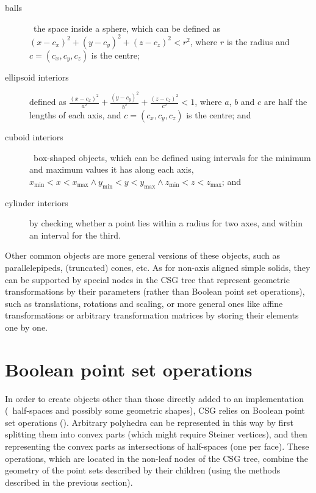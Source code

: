 \begin{description}
\item[balls] \ie\ the space inside a sphere, which can be defined as \( (x-c_x)^2 + (y-c_y)^2 + (z-c_z)^2 < r^2\), where \(r\) is the radius and \(c = (c_x, c_y, c_z)\) is the centre;
\item[ellipsoid interiors] defined as \( \frac{(x-c_x)^2}{a^2} + \frac{(y-c_y)^2}{b^2} + \frac{(z-c_z)^2}{c^2} < 1 \), where \(a\), \(b\) and \(c\) are half the lengths of each axis, and \(c = (c_x, c_y, c_z)\) is the centre; and
\item[cuboid interiors] \ie\ box-shaped objects, which can be defined using intervals for the minimum and maximum values it has along each axis, \ie\ \( x_\mathrm{min} < x < x_\mathrm{max} \wedge y_\mathrm{min} < y < y_\mathrm{max} \wedge z_\mathrm{min} < z < z_\mathrm{max} \); and
\item[cylinder interiors] by checking whether a point lies within a radius for two axes, and within an interval for the third.
\end{description}

Other common objects are more general versions of these objects, such as parallelepipeds, (truncated) cones, etc.
As for non-axis aligned simple solids, they can be supported by special nodes in the CSG tree that represent geometric transformations by their parameters (rather than Boolean point set operations), such as translations, rotations and scaling, or more general ones like affine transformations or arbitrary transformation matrices by storing their elements one by one.

\section{Boolean point set operations}
\label{sec:psetops}

In order to create objects other than those directly added to an implementation (\ie\ half-spaces and possibly some geometric shapes), CSG relies on Boolean point set operations ().
Arbitrary polyhedra can be represented in this way by first splitting them into convex parts (which might require Steiner vertices), and then representing the convex parts as intersections of half-spaces (one per face).
These operations, which are located in the non-leaf nodes of the CSG tree, combine the geometry of the point sets described by their children (using the methods described in the previous section).

